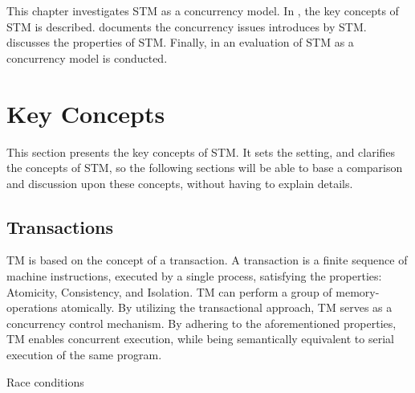 \makeatletter {}\makeatother
{}
This chapter investigates \ac{STM} as a concurrency model. In , the key concepts of \ac{STM} is described.  documents the concurrency issues introduces by \ac{STM}.  discusses the properties of \ac{STM}. Finally, in  an evaluation of \ac{STM} as a concurrency model is conducted.

\section{Key Concepts}
\label{sec:stm_keyconcepts}
This section presents the key concepts of \ac{STM}. It sets the setting, and clarifies the concepts of \ac{STM}, so the following sections will be able to base a comparison and discussion upon these concepts, without having to explain details.

\subsection{Transactions}
\ac{TM} is based on the concept of a transaction. A transaction is a finite sequence of machine instructions, executed by a single process, satisfying the properties: Atomicity, Consistency, and Isolation\cite[p. 2]{herlihy1993transactional}\cite[p. 14]{kalin2012clojure}. \ac{TM} can perform a group of memory-operations atomically\cite[48]{harris2005composable}. By utilizing the transactional approach, \ac{TM} serves as a concurrency control mechanism. By adhering to the aforementioned properties, \ac{TM} enables concurrent execution, while being semantically equivalent to serial execution of the same program.

Race conditions 

